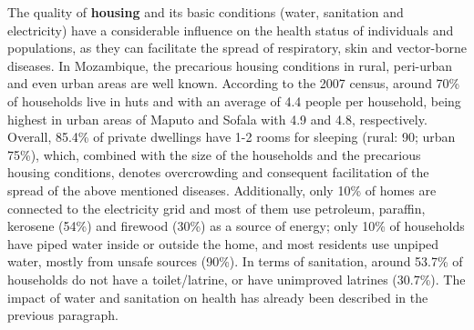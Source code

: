 \documentclass[
]{book}
\begin{document}
The quality of \textbf{housing} and its basic conditions (water, sanitation and electricity) have a considerable influence on the health status of individuals and populations, as they can facilitate the spread of respiratory, skin and vector-borne diseases. In Mozambique, the precarious housing conditions in rural, peri-urban and even urban areas are well known. According to the 2007 census, around 70\% of households live in huts and with an average of 4.4 people per household, being highest in urban areas of Maputo and Sofala with 4.9 and 4.8, respectively. Overall, 85.4\% of private dwellings have 1-2 rooms for sleeping (rural: 90; urban 75\%), which, combined with the size of the households and the precarious housing conditions, denotes overcrowding and consequent facilitation of the spread of the above mentioned diseases. Additionally, only 10\% of homes are connected to the electricity grid and most of them use petroleum, paraffin, kerosene (54\%) and firewood (30\%) as a source of energy; only 10\% of households have piped water inside or outside the home, and most residents use unpiped water, mostly from unsafe sources (90\%). In terms of sanitation, around 53.7\% of households do not have a toilet/latrine, or have unimproved latrines (30.7\%). The impact of water and sanitation on health has already been described in the previous paragraph.
\end{document}
